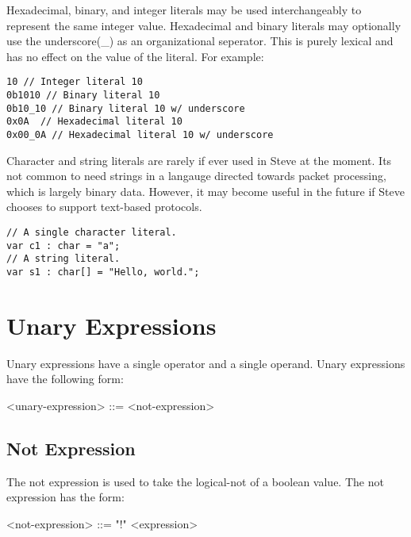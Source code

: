 Hexadecimal, binary, and integer literals may be used interchangeably to represent the same integer value. Hexadecimal and binary literals may optionally use the underscore(\_) as an organizational seperator. This is purely lexical and has no effect on the value of the literal. For example:

\begin{minip}
\begin{lstlisting}
10 // Integer literal 10
0b1010 // Binary literal 10
0b10_10 // Binary literal 10 w/ underscore
0x0A  // Hexadecimal literal 10
0x00_0A // Hexadecimal literal 10 w/ underscore  
\end{lstlisting}
\end{minip}

Character and string literals are rarely if ever used in Steve at the moment. Its not common to need strings in a langauge directed towards packet processing, which is largely binary data. However, it may become useful in the future if Steve chooses to support text-based protocols.

\begin{minip}
\begin{lstlisting}
// A single character literal.
var c1 : char = "a";
// A string literal.
var s1 : char[] = "Hello, world."; 
\end{lstlisting}
\end{minip}


\section{Unary Expressions} \label{unary_expr_guide}

Unary expressions have a single operator and a single operand. Unary expressions have the following form:

\begin{minip}
\begin{grammar}
<unary-expression> ::= 
<not-expression>
\end{grammar}
\end{minip}

\subsection{Not Expression} \label{not_expr_guide}

The not expression is used to take the logical-not of a boolean value. The not expression has the form: 

\begin{minip}
\begin{grammar}
<not-expression> ::= "!" <expression> 
\end{grammar}
\end{minip}

